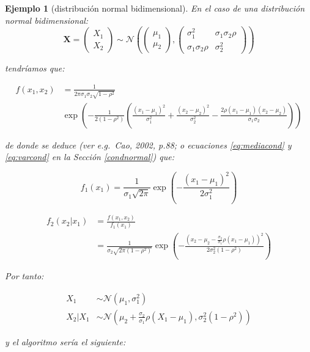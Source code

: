 \documentclass[
]{book}
\theoremstyle{break}
\newtheorem{example}{Ejemplo}[chapter]
\theoremstyle{nonumberplain}
\begin{document}
\begin{example}[distribución normal bidimensional]

En el caso de una distribución normal bidimensional:
\[\mathbf{X} = \begin{pmatrix}
 X_1 \\
 X_2
\end{pmatrix}  
\sim \mathcal{N} \left( \begin{pmatrix}
 \mu_1 \\
 \mu_2
\end{pmatrix} , 
\begin{pmatrix}
 \sigma^2_1 &  \sigma_1 \sigma_2 \rho \\
 \sigma_1 \sigma_2 \rho &  \sigma^2_2
\end{pmatrix} \right)\]

tendríamos que:

\[\begin{aligned}
f(x_1,x_2) &= \frac{1}{2 \pi \sigma_1 \sigma_2 \sqrt{1-\rho^2}} \\
&\exp \left( -\frac{1}{2 (1-\rho^2)} \left( \frac{(x_1 - \mu_1)^2}{\sigma_1^2} + \frac{(x_2 - \mu_2)^2}{\sigma_2^2} - \frac{2 \rho (x_1 - \mu_1) (x_2 - \mu_2)}{ \sigma_1 \sigma_2} \right)
\right)
\end{aligned}\]

de donde se deduce (ver e.g.~Cao, 2002, p.88; o ecuaciones \eqref{eq:mediacond} y \eqref{eq:varcond} en la Sección \ref{condnormal}) que:

\[f_1( x_1 ) = \frac{1}{\sigma_1\sqrt{2\pi}}
\exp\left( -\frac{(x_1 - \mu_1)^{2}}{2\sigma_1^{2}}\right)\]

\[\begin{aligned}
f_2\left( x_2|x_1\right)  &= \frac{f\left( x_1,x_2\right)  }{f_1\left( x_1\right)} \\ &= \frac{1}{\sigma_2\sqrt{2\pi (1-\rho^2)}}
\exp\left( -\frac{\left(x_2 - \mu_2 - \frac{\sigma_2}{\sigma_1}\rho( x_1 - \mu_1)\right)^{2}}{2\sigma_2^2 (1-\rho^2)}\right)
\end{aligned}\]

Por tanto:

\[\begin{aligned}
X_1 &\sim \mathcal{N}\left( \mu_1, \sigma_1^2 \right) \\
X_2 | X_1 &\sim \mathcal{N} \left( \mu_2 + \frac{\sigma_2}{\sigma_1}\rho( X_1 - \mu_1), \sigma_2^2 (1-\rho^2) \right)
\end{aligned}\]

y el algoritmo sería el siguiente:
\end{example}
\end{document}

